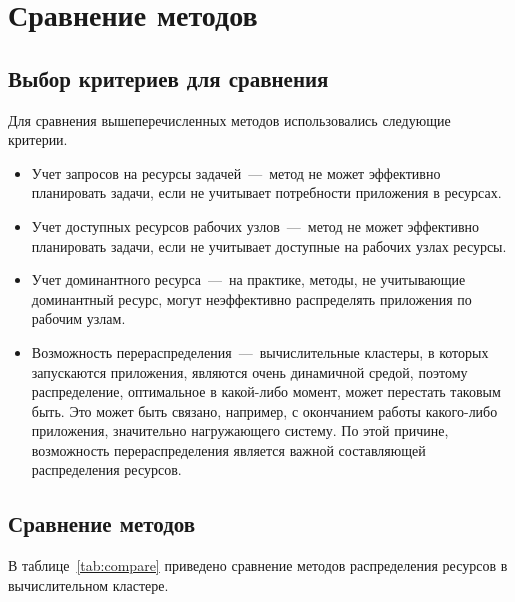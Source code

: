 \chapter{Сравнение методов}

\section{Выбор критериев для сравнения}

Для сравнения вышеперечисленных методов использовались следующие критерии.

\begin{itemize}
	\item Учет запросов на ресурсы задачей~---~метод не может эффективно планировать задачи, если не учитывает потребности приложения в ресурсах.
	\item Учет доступных ресурсов рабочих узлов~---~метод не может эффективно планировать задачи, если не учитывает доступные на рабочих узлах ресурсы.
	\item Учет доминантного ресурса~---~на практике, методы, не учитывающие доминантный ресурс, могут неэффективно распределять приложения по рабочим узлам.
	\item Возможность перераспределения~---~вычислительные кластеры, в которых запускаются приложения, являются очень динамичной средой, поэтому распределение, оптимальное в какой-либо момент, может перестать таковым быть. Это может быть связано, например, с окончанием работы какого-либо приложения, значительно нагружающего систему. По этой причине, возможность перераспределения является важной составляющей распределения ресурсов.
\end{itemize}

\section{Сравнение методов}

В таблице~\ref{tab:compare} приведено сравнение методов распределения ресурсов в вычислительном кластере.

